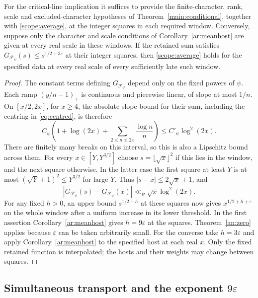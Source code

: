 \begin{corollary}\label{ar:squares}
For the critical-line implication it suffices to provide the
finite-character, rank, scale and excluded-character hypotheses
of Theorem~\ref{main:conditional}, together with \eqref{scope:average},
at the integer squares in each required window. Conversely, suppose only
the character and scale conditions of Corollary~\ref{ar:meanhost}
are given at every real scale in these windows. If the retained
sum satisfies \(G_{\mathcal F_\psi}(s)\le s^{1/2+3\varepsilon}\)
at their integer squares, then \eqref{scope:average} holds for
the specified data at every real scale of every sufficiently late
such window.
\end{corollary}
\begin{proof}
The constant terms defining \(G_{\mathcal F_\psi}\) depend only on
the fixed powers of \(\psi\). Each ramp \((y/n-1)_+\) is continuous
and piecewise linear, of slope at most \(1/n\). On \([x/2,2x]\),
for \(x\ge 4\), the absolute slope bound for their sum, including
the centring in \eqref{eq:centred}, is therefore
\[
 C_\psi\left(1+\log(2x)+
                     \sum_{2\le n\le 2x}\frac{\log n}{n}\right)
       \le C'_\psi\log^2(2x).
\]
There are finitely many breaks on this interval, so this is also
a Lipschitz bound across them. For every \(x\in[Y,Y^{3/2}]\)
choose \(s=\lfloor\sqrt{x}\rfloor^2\) if this lies in the window,
and the next square otherwise. In the latter case the first square
at least \(Y\) is at most \((\sqrt Y+1)^2\le Y^{3/2}\) for large
\(Y\). Thus \(|s-x|\le 2\sqrt{x}+1\), and
\[
 |G_{\mathcal F_\psi}(s)-G_{\mathcal F_\psi}(x)|
                    \ll_\psi\sqrt{x}\log^2(2x).
\]
For any fixed \(h>0\), an upper bound \(s^{1/2+h}\) at these
squares now gives \(x^{1/2+h+\varepsilon}\) on the whole window
after a uniform increase in its lower threshold. In the first
assertion Corollary~\ref{ar:meanhost} gives \(h=9\varepsilon\)
at the squares. Theorem~\ref{an:zero} applies because
\(\varepsilon\) can be taken arbitrarily small. For the converse
take \(h=3\varepsilon\) and apply Corollary~\ref{ar:meanhost}
to the specified host at each real \(x\). Only the fixed retained
function is interpolated; the hosts and their weights may change
between squares.
\end{proof}

\subsection{Simultaneous transport and the exponent \(9\varepsilon\)}

